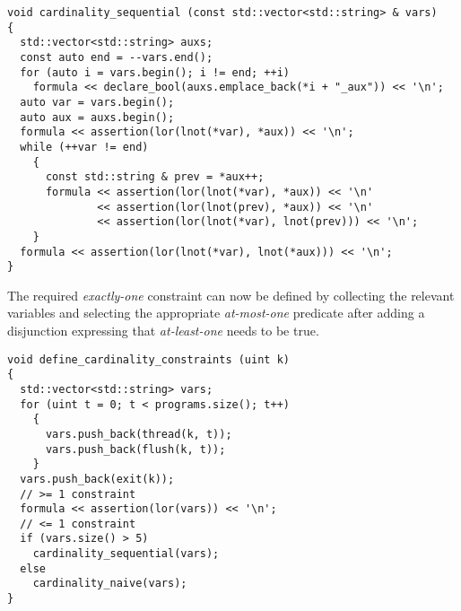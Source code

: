 \begin{lstlisting}[style=c++]
void cardinality_sequential (const std::vector<std::string> & vars)
{
  std::vector<std::string> auxs;
  const auto end = --vars.end();
  for (auto i = vars.begin(); i != end; ++i)
    formula << declare_bool(auxs.emplace_back(*i + "_aux")) << '\n';
  auto var = vars.begin();
  auto aux = auxs.begin();
  formula << assertion(lor(lnot(*var), *aux)) << '\n';
  while (++var != end)
    {
      const std::string & prev = *aux++;
      formula << assertion(lor(lnot(*var), *aux)) << '\n'
              << assertion(lor(lnot(prev), *aux)) << '\n'
              << assertion(lor(lnot(*var), lnot(prev))) << '\n';
    }
  formula << assertion(lor(lnot(*var), lnot(*aux))) << '\n';
}
\end{lstlisting}

%
%
%


\noindent
The required \emph{exactly-one} constraint can now be defined by collecting the relevant variables and selecting the appropriate \emph{at-most-one} predicate after adding a disjunction expressing that \emph{at-least-one} needs to be true.

\begin{lstlisting}[style=c++]
void define_cardinality_constraints (uint k)
{
  std::vector<std::string> vars;
  for (uint t = 0; t < programs.size(); t++)
    {
      vars.push_back(thread(k, t));
      vars.push_back(flush(k, t));
    }
  vars.push_back(exit(k));
  // >= 1 constraint
  formula << assertion(lor(vars)) << '\n';
  // <= 1 constraint
  if (vars.size() > 5)
    cardinality_sequential(vars);
  else
    cardinality_naive(vars);
}
\end{lstlisting}

